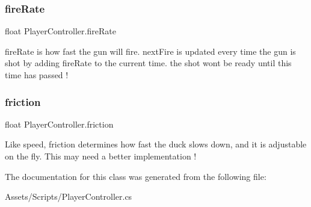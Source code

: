 \subsubsection{\texorpdfstring{fireRate}{fireRate}}
{\footnotesize\ttfamily float Player\+Controller.\+fire\+Rate}

fire\+Rate is how fast the gun will fire. next\+Fire is updated every time the gun is shot by adding fire\+Rate to the current time. the shot won\textquotesingle{}t be ready until this time has passed ! \mbox{\label{class_player_controller_a22510e0221512fb7fe06808912fa1a55}} 
\subsubsection{\texorpdfstring{friction}{friction}}
{\footnotesize\ttfamily float Player\+Controller.\+friction}

Like speed, friction determines how fast the duck slows down, and it is adjustable on the fly. This may need a better implementation ! 

The documentation for this class was generated from the following file\+:\begin{DoxyCompactItemize}
\item 
Assets/\+Scripts/Player\+Controller.\+cs\end{DoxyCompactItemize}
